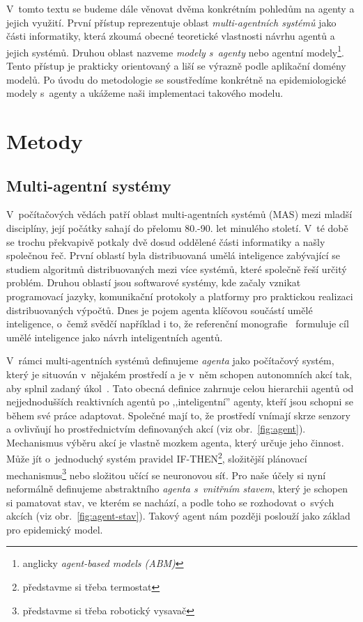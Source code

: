 V~tomto textu se budeme dále věnovat dvěma konkrétním pohledům na agenty a jejich využití. První přístup reprezentuje oblast \emph{multi-agentních systémů} jako části informatiky, která zkoumá obecné teoretické vlastnosti návrhu agentů a jejich systémů. Druhou oblast nazveme \emph{modely s~agenty} nebo agentní modely\footnote{anglicky \emph{agent-based models (ABM)}}. Tento přístup je prakticky orientovaný a liší se výrazně podle aplikační domény modelů. Po úvodu do metodologie se soustředíme konkrétně na epidemiologické modely s~agenty a ukážeme naši implementaci takového modelu.

\section*{Metody} 

\subsection*{Multi-agentní systémy}

V~počítačových vědách patří oblast multi-agentních systémů (MAS) mezi mladší disciplíny, její počátky sahají do přelomu 80.-90. let minulého století. V~té době se trochu překvapivě potkaly dvě dosud oddělené části informatiky a našly společnou řeč. První oblastí byla distribuovaná umělá inteligence zabývající se studiem algoritmů distribuovaných mezi více systémů, které společně řeší určitý problém. Druhou oblastí jsou softwarové systémy, kde začaly vznikat programovací jazyky, komunikační protokoly a platformy pro praktickou realizaci distribuovaných výpočtů. Dnes je pojem agenta klíčovou součástí umělé inteligence, o~čemž svědčí například i to, že referenční monografie~\cite{AIMA20} formuluje cíl umělé inteligence jako návrh inteligentních agentů. 

V~rámci multi-agentních systémů definujeme \emph{agenta} jako počítačový systém, který je situován v~nějakém prostředí a je v~něm schopen autonomních akcí tak, aby splnil zadaný úkol~\cite{Wooldridge09}. Tato obecná definice zahrnuje celou hierarchii agentů od nejjednodušších reaktivních agentů po ,,inteligentní'' agenty, kteří jsou schopni se během své práce adaptovat. Společné mají to, že prostředí vnímají skrze senzory a ovlivňují ho prostřednictvím definovaných akcí (viz obr.~\ref{fig:agent}). Mechanismus výběru akcí je vlastně mozkem agenta, který určuje jeho činnost. Může jít o~jednoduchý systém pravidel IF-THEN\footnote{představme si třeba termostat}, složitější plánovací mechanismus\footnote{představme si třeba robotický vysavač} nebo složitou učící se neuronovou síť. Pro naše účely si nyní neformálně definujeme abstraktního \emph{agenta s~vnitřním stavem}, který je schopen si pamatovat stav, ve kterém se nachází, a podle toho se rozhodovat o~svých akcích (viz obr.~\ref{fig:agent-stav}). Takový agent nám později poslouží jako základ pro epidemický model.  

